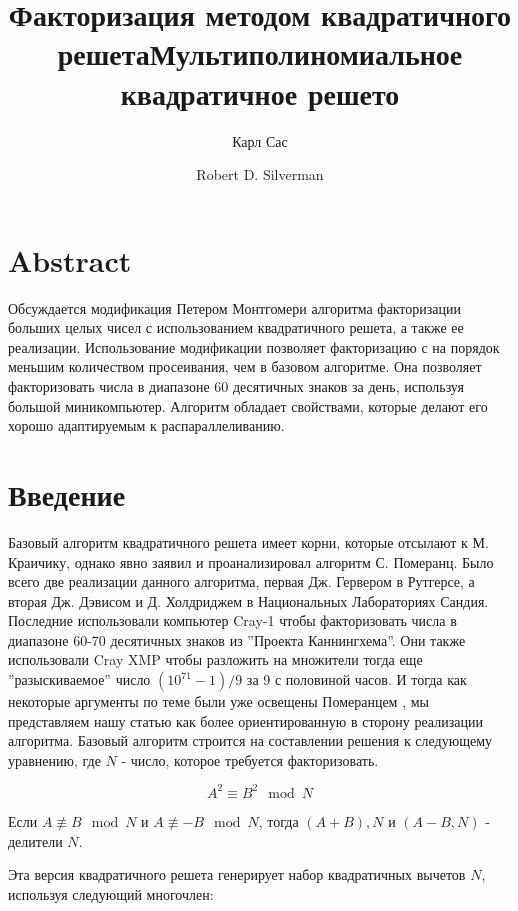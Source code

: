 \documentclass[a4paper,12pt]{report}
\title{Факторизация методом квадратичного решета}
\author{Карл Сас}
\begin{document}
\author{Robert D. Silverman}
\title{Мультиполиномиальное квадратичное решето}

\maketitle

\section{Abstract}

Обсуждается модификация Петером Монтгомери алгоритма факторизации больших целых чисел с использованием квадратичного решета, а также ее реализации. Использование модификации позволяет факторизацию с на порядок меньшим количеством просеивания, чем в базовом алгоритме. Она позволяет факторизовать числа в диапазоне 60 десятичных знаков за день, используя большой миникомпьютер. Алгоритм обладает свойствами, которые делают его хорошо адаптируемым к распараллеливанию.

\section{Введение}
Базовый алгоритм квадратичного решета имеет корни, которые отсылают к М. Краичику, однако явно заявил и проанализировал алгоритм С. Померанц. Было всего две реализации данного алгоритма, первая Дж. Гервером в Рутгерсе, а вторая Дж. Дэвисом и Д. Холдриджем в Национальных Лабораториях Сандия. Последние использовали компьютер Cray-1 чтобы факторизовать числа в диапазоне 60-70 десятичных знаков из ''Проекта Каннингхема''. Они также использовали Cray XMP чтобы разложить на множители тогда еще ''разыскиваемое'' число $(10^{71} -1)/9$ за 9 с половиной часов. И тогда как некоторые аргументы по теме были уже освещены Померанцем \cite{pomer}, мы представляем нашу статью как более ориентированную в сторону реализации алгоритма. Базовый алгоритм строится на составлении решения к следующему уравнению, где $N$ - число, которое требуется факторизовать.

\begin{equation}\label{eq:1}
A^2 \equiv B^2 \mod N
\end{equation}

Если $A \not\equiv B \mod N$ и $A \not\equiv -B \mod N$, тогда $(A + B), N$ и $(A - B, N)$ - делители $N$.

Эта версия квадратичного решета генерирует набор квадратичных вычетов $N$, используя следующий многочлен:
\end{document}
